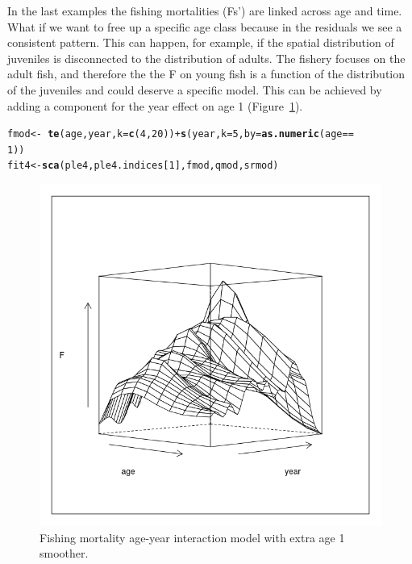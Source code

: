 \documentclass[a4paper,english,10pt]{article}\usepackage[]{graphicx}\usepackage[]{color}
\makeatletter
\def\maxwidth{ %
  \ifdim\Gin@nat@width>\linewidth
    \linewidth
  \else
    \Gin@nat@width
  \fi
}
\newcommand{\hlnum}[1]{\textcolor[rgb]{0.686,0.059,0.569}{#1}}%
\newcommand{\hlopt}[1]{\textcolor[rgb]{0,0,0}{#1}}%
\newcommand{\hlstd}[1]{\textcolor[rgb]{0.345,0.345,0.345}{#1}}%
\newcommand{\hlkwb}[1]{\textcolor[rgb]{0.69,0.353,0.396}{#1}}%
\newcommand{\hlkwc}[1]{\textcolor[rgb]{0.333,0.667,0.333}{#1}}%
\newcommand{\hlkwd}[1]{\textcolor[rgb]{0.737,0.353,0.396}{\textbf{#1}}}%
\newenvironment{kframe}{%
 \def\at@end@of@kframe{}%
 \ifinner\ifhmode%
  \def\at@end@of@kframe{\end{minipage}}%
  \begin{minipage}{\columnwidth}%
 \fi\fi%
 \def\FrameCommand##1{\hskip\@totalleftmargin \hskip-\fboxsep
 \colorbox{shadecolor}{##1}\hskip-\fboxsep
     \hskip-\linewidth \hskip-\@totalleftmargin \hskip\columnwidth}%
 \MakeFramed {\advance\hsize-\width
   \@totalleftmargin\z@ \linewidth\hsize
   \@setminipage}}%
 {\par\unskip\endMakeFramed%
 \at@end@of@kframe}
\newenvironment{knitrout}{}{} %
\makeatother
\begin{document}
In the last examples the fishing mortalities (Fs') are linked across age and time.  What if we want to free up a specific age class because in the residuals we see a consistent pattern.  This can happen, for example, if the spatial distribution of juveniles is disconnected to the distribution of adults.  The fishery focuses on the adult fish, and therefore the the F on young fish is a function of the distribution of the juveniles and could deserve a specific model. This can be achieved by adding a component for the year effect on age 1 (Figure~\ref{fig:age1}).

\begin{knitrout}
\color{fgcolor}\begin{kframe}
\begin{alltt}
\hlstd{fmod} \hlkwb{<-} \hlopt{~}\hlkwd{te}\hlstd{(age, year,} \hlkwc{k} \hlstd{=} \hlkwd{c}\hlstd{(}\hlnum{4}\hlstd{,} \hlnum{20}\hlstd{))} \hlopt{+} \hlkwd{s}\hlstd{(year,} \hlkwc{k} \hlstd{=} \hlnum{5}\hlstd{,} \hlkwc{by} \hlstd{=} \hlkwd{as.numeric}\hlstd{(age} \hlopt{==}
    \hlnum{1}\hlstd{))}
\hlstd{fit4} \hlkwb{<-} \hlkwd{sca}\hlstd{(ple4, ple4.indices[}\hlnum{1}\hlstd{], fmod, qmod, srmod)}
\end{alltt}
\end{kframe}
\end{knitrout}

\begin{knitrout}
\color{fgcolor}\begin{figure}[H]

{\centering \includegraphics[width=\maxwidth]{figure/age1-1} 

}

\caption[Fishing mortality age-year interaction model with extra age 1 smoother]{Fishing mortality age-year interaction model with extra age 1 smoother.}\label{fig:age1}
\end{figure}


\end{knitrout}
\end{document}
